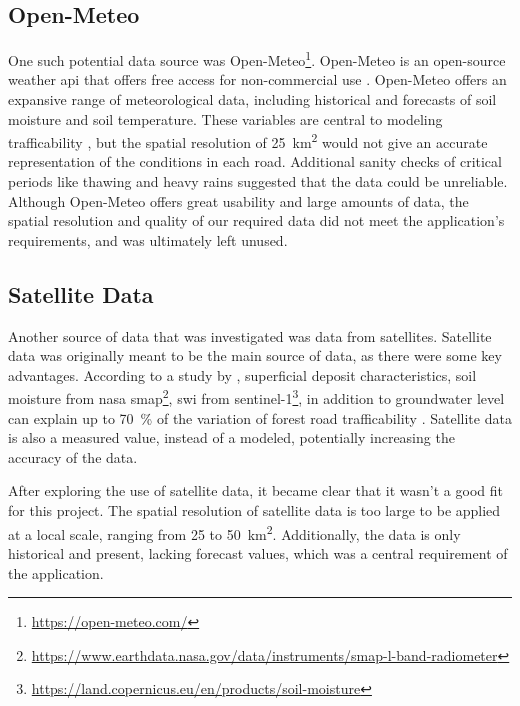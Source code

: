 \subsection{Open-Meteo}

One such potential data source was Open-Meteo\footnote{\url{https://open-meteo.com/}}. Open-Meteo is an open-source weather \acrshort{api} that offers free access for non-commercial use \cite{openmeteo}. Open-Meteo offers an expansive range of meteorological data, including historical and forecasts of soil moisture and soil temperature. These variables are central to modeling trafficability \cite{fjeld2023trafficability}, but the spatial resolution of \qty{25}{\kilo\meter\squared} would not give an accurate representation of the conditions in each road. Additional sanity checks of critical periods like thawing and heavy rains suggested that the data could be unreliable. Although Open-Meteo offers great usability and large amounts of data, the spatial resolution and quality of our required data did not meet the application's requirements, and was ultimately left unused. 

\subsection{Satellite Data}

Another source of data that was investigated was data from satellites. Satellite data was originally meant to be the main source of data, as there were some key advantages. According to a study by \textcite{fjeld2023trafficability}, superficial deposit characteristics, soil moisture from \acrshort{nasa} \gls{smap}\footnote{\url{https://www.earthdata.nasa.gov/data/instruments/smap-l-band-radiometer}}, \acrfull{swi} from \Gls{sentinel-1}\footnote{\url{https://land.copernicus.eu/en/products/soil-moisture}}, in addition to \gls{groundwater} level can explain up to \qty{70}{\percent} of the variation of forest road trafficability \cite{fjeld2023trafficability}. Satellite data is also a measured value, instead of a modeled, potentially increasing the accuracy of the data.

After exploring the use of satellite data, it became clear that it wasn't a good fit for this project. The spatial resolution of satellite data is too large to be applied at a local scale, ranging from \qty{25}{} to \qty{50}{\kilo\meter\squared}. Additionally, the data is only historical and present, lacking forecast values, which was a central requirement of the application. 

